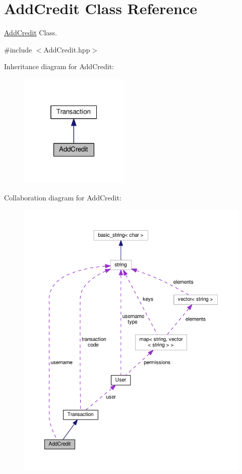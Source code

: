 \hypertarget{class_add_credit}{\section{Add\-Credit Class Reference}
\label{class_add_credit}
}


\hyperlink{class_add_credit}{Add\-Credit} Class.  




{\ttfamily \#include $<$Add\-Credit.\-hpp$>$}



Inheritance diagram for Add\-Credit\-:
\nopagebreak
\begin{figure}[H]
\begin{center}
\leavevmode
\includegraphics[width=148pt]{class_add_credit__inherit__graph}
\end{center}
\end{figure}


Collaboration diagram for Add\-Credit\-:
\nopagebreak
\begin{figure}[H]
\begin{center}
\leavevmode
\includegraphics[width=350pt]{class_add_credit__coll__graph}
\end{center}
\end{figure}
